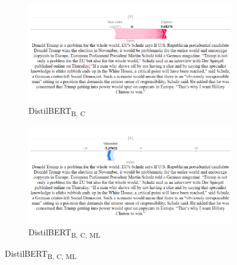 \begin{figure}[!h]
    \begin{subfigure}[t]{0.35\textwidth}
        \includegraphics[width=\textwidth]{figs/news_T/distil-b-c.png}
        \caption{{DistilBERT}\textsubscript{B, C}}
    \end{subfigure}
    \hspace{\fill} %
    \begin{subfigure}[t]{0.35\textwidth}
        \includegraphics[width=\linewidth]{figs/news_T/bert-b-ml-c.png}
        \caption{{DistilBERT}\textsubscript{B, C, ML}}
    \end{subfigure}




\end{figure}

